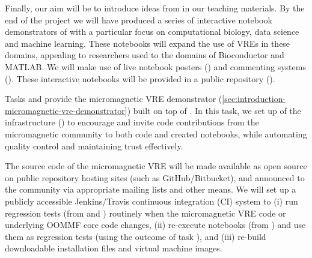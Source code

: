 \begin{workpackage}
\begin{tasklist}
\begin{task}[title=Introduce \TheProject to Researchers and Teachers, id=project-intro,lead=USH,PM=14]
\begin{task}[title=Introduce \TheProject to Researchers and Teachers, id=project-intro,lead=USH,PM=20,partners={USO}]
  Finally, our aim will be to introduce ideas from
   in our teaching materials. By the end of the
  project we will have produced a series of interactive notebook
  demonstrators  of \TheProject with a
  particular focus on computational biology, data science and machine
  learning. These notebooks will expand the use of VREs in these
  domains, appealing to researchers used to the domains of
  Bioconductor and MATLAB. We will make use of live notebook posters
  () and commenting systems
  (). These interactive notebooks
  will be provided in a public repository
  ().
\end{task}

\begin{task}[id=dissemination-of-oommf-nb-virtual-environment,
  title=Open source dissemination of micromagnetic VRE,
  lead=USO,PM=4,partners={SR,USH,PS},wphases=24-28]
  Tasks  and
   provide the
  micromagnetic VRE demonstrator
  (\ref{sec:introduction-micromagnetic-vre-demonstrator}) built on top
  of \TheProject.  In this task, we set up of the infrastructure
  () to encourage
  and invite code contributions from the micromagnetic community to
  both code and created notebooks, while automating quality control
  and maintaining trust effectively.

  The source code of the micromagnetic VRE will be made available as
  open source on public repository hosting sites (such as
  GitHub/Bitbucket), and announced to the community via appropriate
  mailing lists and other means. We will set up a publicly accessible
  Jenkins/Travis continuous integration (CI) system to (i) run
  regression tests (from
   and
  ) routinely when the
  micromagnetic VRE code or underlying OOMMF core code changes, (ii)
  re-execute notebooks (from
  ) and use them as
  regression tests (using the outcome of task
  ), and (iii) re-build
  downloadable installation files and virtual machine images.



\end{task}
\end{task}
\end{tasklist}
\end{workpackage}
